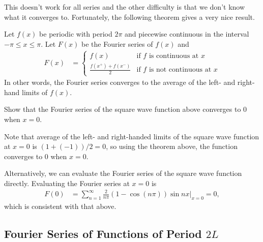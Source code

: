 This doesn't work for all series and the other difficulty is that we don't know what it converges to.  Fortunately, the following theorem gives a very nice result.  

\begin{theorem}
Let $f(x)$ be periodic with period $2\pi$ and piecewise continuous in the interval $-\pi \leq x \leq \pi$. Let $F(x)$ be the Fourier series of $f(x)$ and 
%
\begin{align*}
F(x) & = \begin{cases} f(x) & \text{if $f$ is continuous at $x$} \\
\frac{f(x^+)+f(x^-)}{2} & \text{if $f$ is not continuous at $x$}
\end{cases}
\end{align*}
In other words, the Fourier series converges to the average of the left- and right-hand limits of $f(x)$.    
\end{theorem}


\begin{example}
Show that the Fourier series of the square wave function above converges to 0 when $x=0$. 

\solution

Note that average of the left- and right-handed limits of the square wave function at $x=0$ is $(1+(-1))/2=0$, so using the theorem above, the function converges to 0 when $x=0$. 

Alternatively, we can evaluate the Fourier series of the square wave function directly.  Evaluating the Fourier series at $x=0$ is 
% 
\begin{align*}
F(0) & = \sum_{n=1}^{\infty} \frac{2}{n\pi} (1-\cos(n\pi)) \sin n x \biggl \vert_{x=0} = 0,
\end{align*}
which is consistent with that above. 

\end{example}



\subsection{Fourier Series of Functions of Period $2L$} 

